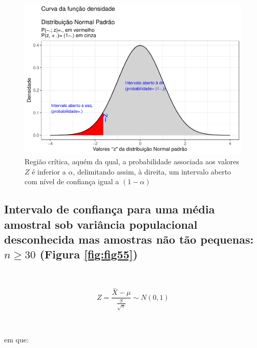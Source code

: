 \documentclass[
]{book}
\begin{document}
\begin{figure}

{\centering \includegraphics[width=1\linewidth]{apostila_files/figure-latex/fig54-1} 

}

\caption{Região crítica, aquém da qual, a probabilidade associada aos valores $Z$ é inferior a $\alpha$, delimitando assim, à direita, um intervalo aberto com nível de confiança igual a $(1-\alpha)$}\label{fig:fig54}
\end{figure}

\hypertarget{intervalo-de-confianuxe7a-para-uma-muxe9dia-amostral-sob-variuxe2ncia-populacional-desconhecida-mas-amostras-nuxe3o-tuxe3o-pequenas-n-ge-30-figura-reffigfig55}{%
\subsection{\texorpdfstring{Intervalo de confiança para uma média amostral sob variância populacional desconhecida mas amostras não tão pequenas: \(n \ge 30\) (Figura \ref{fig:fig55})}{Intervalo de confiança para uma média amostral sob variância populacional desconhecida mas amostras não tão pequenas: n \textbackslash ge 30 (Figura \ref{fig:fig55})}}\label{intervalo-de-confianuxe7a-para-uma-muxe9dia-amostral-sob-variuxe2ncia-populacional-desconhecida-mas-amostras-nuxe3o-tuxe3o-pequenas-n-ge-30-figura-reffigfig55}}

~

\[
Z = \frac{\stackrel{-}{X} - \mu}{\frac{S}{\sqrt{n}}}  \sim N(0 , 1)
\]

~

em que:

\hfill\break
\end{document}
